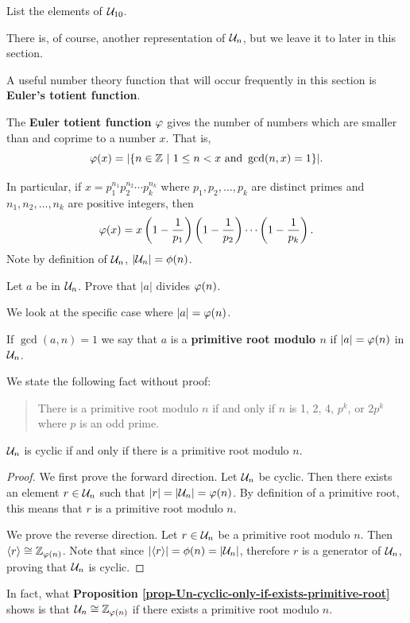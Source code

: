 \begin{exercise}
    List the elements of $\mathcal{U}_{10}$.
\end{exercise}

There is, of course, another representation of $\mathcal{U}_{n}$, but we leave it to later in this section.

A useful number theory function that will occur frequently in this section is \textbf{Euler's totient function}.
\begin{definition}
    The \textbf{Euler totient function} $\varphi$ gives the number of numbers which are smaller than and coprime to a number $x$. That is,
    \[
        \varphi(x) = |\{n \in \mathbb{Z} \ | \ 1 \leq n < x \text{ and } \gcd(n, x) = 1\}|.
    \]
\end{definition}
In particular, if $x = p_1^{n_1}p_2^{n_2}\cdots p_k^{n_k}$ where $p_1, p_2,\dots,p_k$ are distinct primes and $n_1,n_2,\dots,n_k$ are positive integers, then
\[
    \varphi(x) = x \left(1 - \frac1{p_1}\right)\left(1 - \frac1{p_2}\right)\cdots\left(1 - \frac1{p_k}\right).
\]
Note by definition of $\mathcal{U}_{n}$, $|\mathcal{U}_{n}| = \phi(n)$.

\begin{exercise}\label{exercise-order-of-a-divides-phi-a}
    Let $a$ be in $\mathcal{U}_{n}$. Prove that $|a|$ divides $\varphi(n)$.
\end{exercise}

We look at the specific case where $|a| = \varphi(n)$.
\begin{definition}
    If $\gcd(a, n) = 1$ we say that $a$ is a \textbf{primitive root modulo $n$} if $|a| = \varphi(n)$ in $\mathcal{U}_{n}$.
\end{definition}
We state the following fact without proof:
\begin{quote}
    There is a primitive root modulo $n$ if and only if $n$ is 1, 2, 4, $p^k$, or $2p^k$ where $p$ is an odd prime.
\end{quote}

\begin{proposition}\label{prop-Un-cyclic-only-if-exists-primitive-root}
    $\mathcal{U}_{n}$ is cyclic if and only if there is a primitive root modulo $n$.
\end{proposition}
\begin{proof}
    We first prove the forward direction. Let $\mathcal{U}_{n}$ be cyclic. Then there exists an element $r \in \mathcal{U}_{n}$ such that $|r| = |\mathcal{U}_{n}| = \varphi(n)$. By definition of a primitive root, this means that $r$ is a primitive root modulo $n$.

    We prove the reverse direction. Let $r \in \mathcal{U}_{n}$ be a primitive root modulo $n$. Then $\langle r \rangle \cong \mathbb{Z}_{\varphi(n)}$. Note that since $|\langle r \rangle| = \phi(n) = |\mathcal{U}_{n}|$, therefore $r$ is a generator of $\mathcal{U}_{n}$, proving that $\mathcal{U}_{n}$ is cyclic.
\end{proof}
\begin{remark}
    In fact, what \textbf{Proposition \ref{prop-Un-cyclic-only-if-exists-primitive-root}} shows is that $\mathcal{U}_{n} \cong \mathbb{Z}_{\varphi(n)}$ if there exists a primitive root modulo $n$.
\end{remark}


